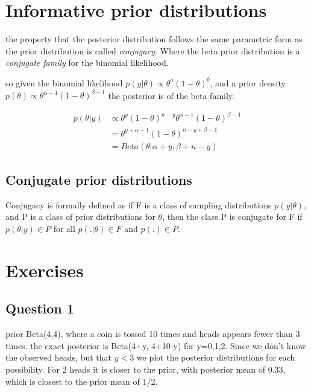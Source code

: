 \documentclass[
]{book}
\theoremstyle{definition}
\theoremstyle{definition}
\theoremstyle{definition}
\theoremstyle{definition}
\theoremstyle{remark}
\begin{document}
\hypertarget{informative-prior-distributions}{%
\section{Informative prior distributions}\label{informative-prior-distributions}}

the property that the posterior distribution follows the same parametric form as the prior distribution is called \emph{conjugacy}. Where the beta prior distribution is a \emph{conjugate family} for the binomial likelihood.

so given the binomial likelihood \(p(y|\theta)\propto \theta^a(1-\theta)^b\), and a prior density \(p(\theta)\propto \theta^{\alpha-1}(1-\theta)^{\beta-1}\) the posterior is of the beta family.

\[
\begin{aligned}
 p(\theta | y) &\propto \theta^y(1-\theta)^{n-y}\theta^{\alpha-1}(1-\theta)^{\beta-1}\\
 &= \theta^{y+\alpha-1}(1-\theta)^{n-y+\beta-1}\\
 &= Beta(\theta | \alpha+y, \beta+n-y)
\end{aligned}
\]

\hypertarget{conjugate-prior-distributions}{%
\subsection*{Conjugate prior distributions}\label{conjugate-prior-distributions}}

Conjugacy is formally defined as if F is a class of sampling distributions \(p(y|\theta)\), and P is a class of prior distributions for \(\theta\), then the class P is conjugate for F if \(p(\theta | y) \in P\) for all \(p(.|\theta)\in F\) and \(p(.)\in P\).

\hypertarget{exercises-1}{%
\section{Exercises}\label{exercises-1}}

\hypertarget{question-1}{%
\subsection*{Question 1}\label{question-1}}

prior Beta(4,4), where a coin is tossed 10 times and heads appears fewer than 3 times. the exact posterior is Beta(4+y, 4+10-y) for y=0,1,2. Since we don't know the observed heads, but that \(y<3\) we plot the posterior distributions for each possibility. For 2 heads it is closer to the prior, with posterior mean of 0.33, which is closest to the prior mean of 1/2.
\end{document}
